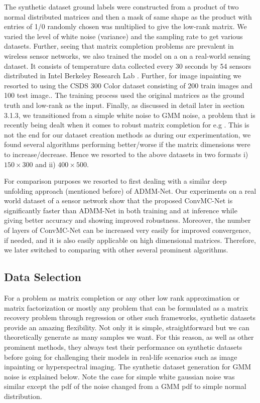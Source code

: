 The synthetic dataset ground labels were constructed from a product of two normal distributed matrices and then a mask of same shape as the product with entries of 1/0 randomly chosen was multiplied to give the low-rank matrix. We varied the level of white noise (variance) and the sampling rate to get various datasets. Further, seeing that matrix completion problems are prevalent in wireless sensor networks, we also trained the model on a on a real-world sensing dataset. It consists of temperature data collected every 30 seconds by 54 sensors distributed in Intel Berkeley Research Lab \cite{intelberkeley2004}. Further, for image inpainting we resorted to using the CSDS 300 Color dataset \cite{MartinFTM01} consisting of 200 train images and 100 test image.. The training process used the original matrices as the ground truth and low-rank as the input. Finally, as discussed in detail later in section 3.1.3, we transitioned from a simple white noise to GMM noise, a problem that is recently being dealt when it comes to robust matrix completion for e.g \cite{lo-bcd}. This is not the end for our dataset creation methods as during our experimentation, we found several algorithms performing better/worse if the matrix dimensions were to increase/decrease. Hence we resorted to the above datasets in two formats i) $150 \times 300$ and ii) $400 \times 500$. 

For comparison purposes we resorted to first dealing with a similar deep unfolding approach (mentioned before) of ADMM-Net. Our experiments on a real world dataset of a sensor network show that the proposed ConvMC-Net is significantly faster than ADMM-Net in both training and at inference while giving better accuracy and showing improved robustness. Moreover, the number of layers of ConvMC-Net can be increased very easily for improved convergence, if needed, and it is also easily applicable on high dimensional matrices. Therefore, we later switched to comparing with other several prominent algorithms. 

\subsection{Data Selection}

For a problem as matrix completion or any other low rank approximation or matrix factorization or mostly any problem that can be formulated as a matrix recovery problem through regression or other such frameworks, synthetic datasets provide an amazing flexibility. Not only it is simple, straightforward but we can theoretically generate as many samples we want. For this reason, as well as other prominent methods, they always test their performance on synthetic datasets before going for challenging their models in real-life scenarios such as image inpainting or hyperspectral imaging. The synthetic dataset generation for GMM noise is explained below. Note the case for simple white gaussian noise was similar except the pdf of the noise changed from a GMM pdf to simple normal distribution. 


